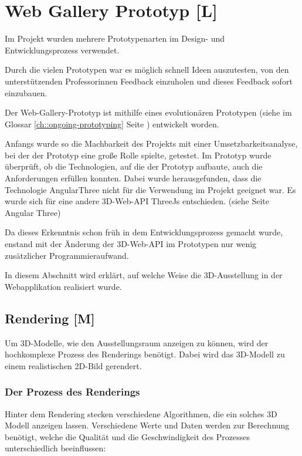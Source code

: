 \section{Web Gallery Prototyp [L]}
Im Projekt wurden mehrere Prototypenarten im Design- und Entwicklungsprozess verwendet.


Durch die vielen Prototypen war es möglich schnell Ideen auszutesten, von den unterstützenden Professorinnen Feedback einzuholen und dieses Feedback sofort einzubauen.


Der Web-Gallery-Prototyp ist mithilfe eines evolutionären Prototypen (siehe im Glossar \ref{ch::ongoing-prototyping} Seite \pageref{ch::ongoing-prototyping}) entwickelt worden.


Anfangs wurde so die Machbarkeit des Projekts mit einer Umsetzbarkeitsanalyse, bei der der Prototyp eine große Rolle spielte, getestet. Im Prototyp wurde überprüft, ob die Technologien, auf die der Prototyp aufbaute, auch die Anforderungen erfüllen konnten. Dabei wurde herausgefunden, dass die Technologie AngularThree nicht für die Verwendung im Projekt geeignet war. Es wurde sich für eine andere 3D-Web-API ThreeJs entschieden. (siehe Seite \pageref{ch:Technologien:AngularThree} Angular Three)


Da dieses Erkenntnis schon früh in dem Entwicklungsprozess gemacht wurde, enstand mit der Änderung der 3D-Web-API im Prototypen nur wenig zusätzlicher Programmieraufwand.


In diesem Abschnitt wird erklärt, auf welche Weise die 3D-Ausstellung in der Webapplikation realisiert wurde.

\subsection{Rendering [M]} 
Um 3D-Modelle, wie den Ausstellungsraum anzeigen zu können, wird der hochkomplexe Prozess des Renderings benötigt. Dabei wird das 3D-Modell zu einem realistischen 2D-Bild gerendert. 
\cite{AdobeRendering} \cite{Rendering3DModels}

\subsubsection{Der Prozess des Renderings}
Hinter dem Rendering stecken verschiedene Algorithmen, die ein solches 3D Modell anzeigen lassen. Verschiedene Werte und Daten werden zur Berechnung benötigt, welche die Qualität und die Geschwindigkeit des Prozesses unterschiedlich beeinflussen:

